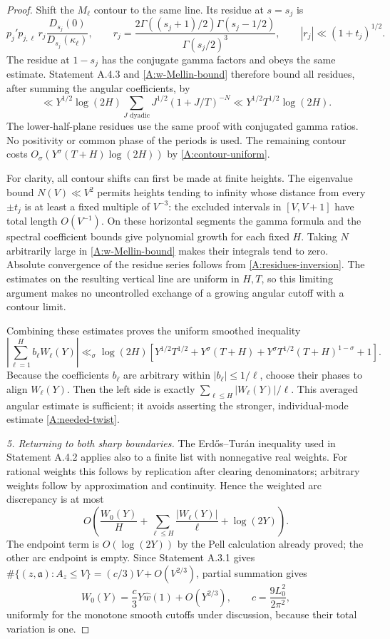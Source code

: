 \begin{proof}
Shift the $M_\ell$ contour to the same line. Its residue at $s=s_j$ is
\[
 p_j'p_{j,\ell}\,r_j\frac{D_{s_j}(0)}{D_{s_j}(\kappa_\ell)},\qquad
 r_j=\frac{2\Gamma((s_j+1)/2)\Gamma(s_j-1/2)}{\Gamma(s_j/2)^3},
 \qquad |r_j|\ll(1+t_j)^{1/2}.
\]
The residue at $1-s_j$ has the conjugate gamma factors and obeys
the same estimate. Statement A.4.3 and
\eqref{A:w-Mellin-bound} therefore bound all residues, after summing
the angular coefficients, by
\begin{equation}\label{A:residues-inversion}
 \ll Y^{1/2}\log(2H)
      \sum_{J\text{ dyadic}}J^{1/2}(1+J/T)^{-N}
 \ll Y^{1/2}T^{1/2}\log(2H).
\end{equation}
The lower-half-plane residues use the same proof with conjugated
gamma ratios. No positivity or common phase of the periods is used.
The remaining contour costs
$O_\sigma(Y^\sigma(T+H)\log(2H))$ by
\eqref{A:contour-uniform}.

For clarity, all contour shifts can first be made at finite heights.
The eigenvalue bound $N(V)\ll V^2$ permits heights tending to infinity
whose distance from every $\pm t_j$ is at least a fixed multiple of
$V^{-3}$: the excluded intervals in $[V,V+1]$ have total length
$O(V^{-1})$. On these horizontal segments the gamma formula and
the spectral coefficient bounds give polynomial growth for each
fixed $H$. Taking $N$ arbitrarily large in
\eqref{A:w-Mellin-bound} makes their integrals tend to zero.
Absolute convergence of the residue series follows from
\eqref{A:residues-inversion}. The estimates on the resulting vertical
line are uniform in $H,T$, so this limiting argument makes no
uncontrolled exchange of a growing angular cutoff with a contour limit.

Combining these estimates proves the uniform smoothed inequality
\begin{equation}\label{A:smoothed-angular-sum}
 \left|\sum_{\ell=1}^H b_\ell W_\ell(Y)\right|
 \ll_\sigma\log(2H)\left[
 Y^{1/2}T^{1/2}+Y^\sigma(T+H)
 +Y^\sigma T^{1/2}(T+H)^{1-\sigma}+1\right].
\end{equation}
Because the coefficients $b_\ell$ are arbitrary within
$|b_\ell|\leq1/\ell$, choose their phases to align $W_\ell(Y)$.
Then the left side is exactly
$\sum_{\ell\leq H}|W_\ell(Y)|/\ell$.
This averaged angular estimate is sufficient; it avoids asserting
the stronger, individual-mode estimate \eqref{A:needed-twist}.

\emph{5. Returning to both sharp boundaries.}
The Erd\H{o}s--Tur\'an inequality used in Statement A.4.2 applies
also to a finite list with nonnegative real weights. For rational
weights this follows by replication after clearing denominators;
arbitrary weights follow by approximation and continuity. Hence the
weighted arc discrepancy is at most
\[
 O\left(\frac{W_0(Y)}H+
       \sum_{\ell\leq H}\frac{|W_\ell(Y)|}{\ell}+\log(2Y)\right).
\]
The endpoint term is $O(\log(2Y))$ by the Pell calculation already
proved; the other arc endpoint is empty.
Since Statement A.3.1 gives
$\#\{(z,\mathfrak a):A_z\leq V\}=(c/3)V+O(V^{2/3})$,
partial summation gives
\[
 W_0(Y)=\frac c3Y\widehat w(1)+O(Y^{2/3}),
 \qquad c=\frac{9L_0^2}{2\pi^2},
\]
uniformly for the monotone smooth cutoffs under discussion, because
their total variation is one.


\end{proof}
